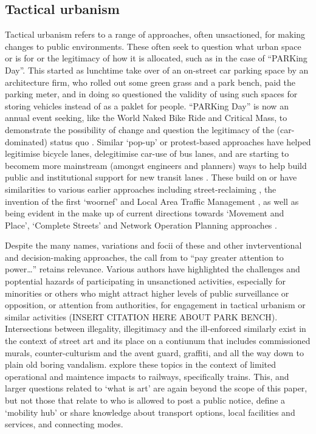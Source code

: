 \documentclass[preprint, 3p,
authoryear]{elsarticle} %
\begin{document}
\subsection{Tactical urbanism}\label{tactical-urbanism}

Tactical urbanism refers to a range of approaches, often unsactioned,
for making changes to public environments. These often seek to question
what urban space or is for or the legitimacy of how it is allocated,
such as in the case of ``PARKing Day''. This started as lunchtime take
over of an on-street car parking space by an architecture firm, who
rolled out some green grass and a park bench, paid the parking meter,
and in doing so questioned the validity of using such spaces for storing
vehicles instead of as a paklet for people. ``PARKing Day'' is now an
annual event seeking, like the World Naked Bike Ride and Critical Mass,
to demonstrate the possibility of change and question the legitimacy of
the (car-dominated) status quo
\cite{Lydon:2012aa,Davidson:2013aa,Lydon:2015aa,Blumgart:2016ab, Ride:2009aa, Morhayim:2012aa, Longhurst:2015aa}.
Similar `pop-up' or protest-based approaches have helped legitimise
bicycle lanes, delegitimise car-use of bus lanes, and are starting to
becomem more mainstream (amongst engineers and planners) ways to help
build public and institutional support for new transit lanes
\cite{Fucoloro:2013aa,News:2019ab, TransitCenter:2018ab, Transportation-Studies:2019aa}.
These build on or have similarities to various earlier approaches
including street-reclaiming
\cite{Dobson:2023ae,Engwicht:1999aa,Fotel:2009aa,Institute:2015aa}, the
invention of the first `woornef' \cite{Guttenberg:1982aa} and Local Area
Traffic Management \cite{Damen:2017aa}, as well as being evident in the
make up of current directions towards `Movement and Place', `Complete
Streets' and Network Operation Planning approaches
\cite{Delbosc:2018aa}.

Despite the many names, variations and focii of these and other
invterventional and decision-making approaches, the call from
\cite{Marsden:2017aa} to ``pay greater attention to power\ldots{}''
retains relevance. Various authors have highlighted the challenges and
poptential hazards of participating in unsanctioned activities,
especially for minorities or others who might attract higher levels of
public surveillance or opposition, or attention from authorities, for
engagement in tactical urbanism or similar activities (INSERT CITATION
HERE ABOUT PARK BENCH). Intersections between illegality, illegitimacy
and the ill-enforced similarly exist in the context of street art and
its place on a contiunum that includes commissioned murals,
counter-culturism and the avent guard, graffiti, and all the way down to
plain old boring vandalism. \cite{Killen:2017aa,Killen:2021aa} explore
these topics in the context of limited operational and maintence impacts
to railways, specifically trains. This, and larger questions related to
`what is art' are again beyond the scope of this paper, but not those
that relate to who is allowed to post a public notice, define a
`mobility hub' or share knowledge about transport options, local
facilities and services, and connecting modes.
\end{document}
